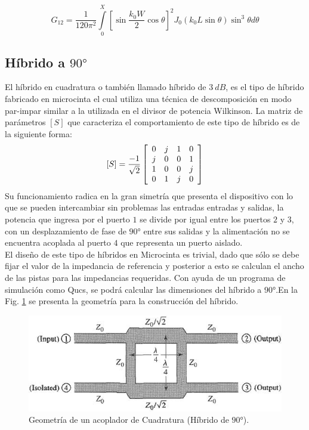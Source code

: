 \documentclass[twocolumn]{IEEEtran}
\begin{document}
\begin{equation}
 G_{12}  = \frac{1}{{120\pi ^2 }}\int\limits_0^X {\left[ {\sin \frac{{k_0 W}}{2}\cos \theta } \right]} ^2 J_0 \left( {k_0 L\sin \theta } \right)\sin ^3 \theta d\theta
\label{ecu6}
\end{equation}

\subsection{Híbrido a $90°$}
\noindent
El híbrido en cuadratura o también llamado híbrido de $3\ dB$, es el tipo de híbrido fabricado en microcinta el cual utiliza una técnica de descomposición en modo par-impar similar a la utilizada en el divisor de potencia Wilkinson. La matriz de parámetros $[S]$ que caracteriza el comportamiento de este tipo de híbrido es de la siguiente forma:
$$
\left[ S \right] = \frac{{ - 1}}{{\sqrt 2 }}\left[ {\begin{array}{*{20}c}
   0 & j & 1 & 0  \\
   j & 0 & 0 & 1  \\
   1 & 0 & 0 & j  \\
   0 & 1 & j & 0  \\
\end{array}} \right]
$$
\noindent
Su funcionamiento radica en la gran simetría que presenta el dispositivo con lo que se pueden intercambiar sin problemas las entradas entradas y salidas, la potencia que ingresa por el puerto $1$ se divide por igual entre los puertos $2$ y $3$, con un desplazamiento de fase de $90°$ entre sus salidas y la alimentación no se encuentra acoplada al puerto $4$ que representa un puerto aislado.\\
El diseño de este tipo de híbridos en Microcinta es trivial, dado que sólo se debe fijar el valor de la impedancia de referencia y posterior a esto se calculan  el ancho de las pistas para las impedancias requeridas. Con ayuda de un programa de simulación como Qucs, se podrá calcular las dimensiones del híbrido a $90°$.En la Fig. \ref{fig100} se presenta la geometría para la construcción del  híbrido.
\begin{figure}[H]
	\centering
		\includegraphics[scale=0.6]{hibrido.png}
	\caption{Geometría de un acoplador de Cuadratura (Híbrido de $90°$).}
	\label{fig100}
\end{figure}
\end{document}
